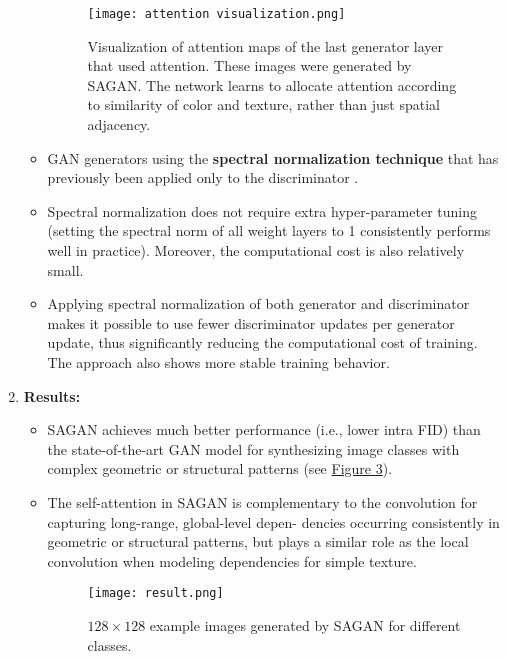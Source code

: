 \documentclass[11pt]{article}
\begin{document}
\begin{enumerate}[\arabic*]
\begin{itemize}
\begin{figure}[!ht]
    \centering
    \texttt{[image: attention visualization.png]}
    \caption{Visualization of attention maps of the last generator layer that used attention. These images were generated by SAGAN. The network learns to allocate attention according to similarity of color and texture, rather than just spatial adjacency.}
    \label{fig:attention visualization}
\end{figure}

        \item GAN generators using the \textbf{spectral normalization technique} that has previously been applied only to the discriminator \cite{https://doi.org/10.48550/arxiv.1802.05957}.\\
        
         \item Spectral normalization does not require extra hyper-parameter tuning (setting the spectral norm of all weight layers to 1 consistently performs well in practice). Moreover, the computational cost is also relatively small.\\

         \item Applying spectral normalization of both generator and discriminator makes it possible to use fewer discriminator updates per generator update, thus significantly reducing the computational cost of training. The approach also shows more stable training behavior.

    \end{itemize}
    
    \item
    \textbf{Results:}   
    \begin{itemize}
        \item SAGAN achieves much better performance (i.e., lower intra FID) than the state-of-the-art GAN model for synthesizing image classes with complex geometric or structural patterns (see \hyperref[fig:result]{Figure 3}).
        \item  The self-attention in SAGAN is complementary to the convolution for capturing long-range, global-level depen- dencies occurring consistently in geometric or structural patterns, but plays a similar role as the local convolution when modeling dependencies for simple texture.
        \begin{figure}[!ht]
        \centering
        \texttt{[image: result.png]}
        \caption{$128 \times 128$ example images generated by SAGAN for different classes.}
        \label{fig:result}
    \end{figure}
    \end{itemize}
    
\end{enumerate}
\nocite{*}
\pagebreak



\end{document}
